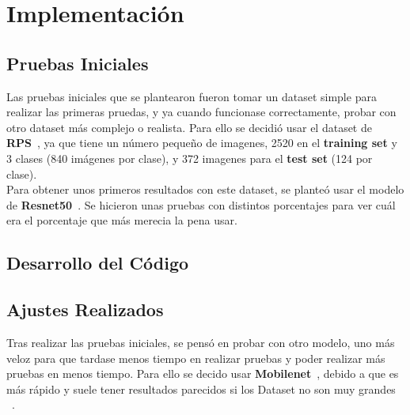 \chapter{Implementación}\label{ch:implementacion}

\section{Pruebas Iniciales}\label{sec:pruebas_iniciales}
Las pruebas iniciales que se plantearon fueron tomar un dataset simple para realizar las primeras pruedas, y ya cuando
funcionase correctamente, probar con otro dataset más complejo o realista.
Para ello se decidió usar el dataset de \textbf{RPS}~\cite{}, ya que tiene un número pequeño de imagenes, 2520 en el
\textbf{training set} y 3 clases (840 imágenes por clase), y 372 imagenes para el \textbf{test set} (124 por clase).
\\[6pt]

Para obtener unos primeros resultados con este dataset, se planteó usar el modelo de \textbf{Resnet50}~\cite{}.
Se hicieron unas pruebas con distintos porcentajes para ver cuál era el porcentaje que más merecia la pena usar.
\\[6pt]

\section{Desarrollo del Código}\label{sec:desarrollo_del_codigo}

\section{Ajustes Realizados}\label{sec:ajustes_realizados}

Tras realizar las pruebas iniciales, se pensó en probar con otro modelo, uno más veloz para que tardase menos tiempo en
realizar pruebas y poder realizar más pruebas en menos tiempo.
Para ello se decido usar \textbf{Mobilenet}~\cite{}, debido a que es más rápido y suele tener resultados parecidos si
los Dataset no son muy grandes ~\cite{ResnetVsMobilenet}.
